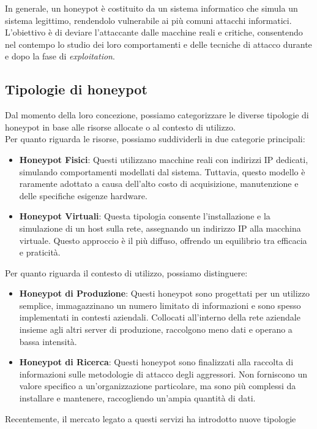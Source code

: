 \documentclass[12pt,a4paper,oneside,onecolumn,openright]{book}
\begin{document}
In generale, un honeypot è costituito da un sistema informatico che simula un 
sistema legittimo, rendendolo vulnerabile ai più comuni attacchi informatici. 
L'obiettivo è di deviare l'attaccante dalle macchine reali e critiche, consentendo 
nel contempo lo studio dei loro comportamenti e delle tecniche di attacco durante e 
dopo la fase di \textit{exploitation}.\\

\subsection{Tipologie di honeypot}
Dal momento della loro concezione, possiamo categorizzare le diverse tipologie di 
honeypot in base alle risorse allocate o al contesto di utilizzo.\\
Per quanto riguarda le risorse, possiamo suddividerli in due categorie principali:
\begin{itemize}
	\item \textbf{Honeypot Fisici}: Questi utilizzano macchine reali con indirizzi IP 
	dedicati, simulando comportamenti modellati dal sistema. Tuttavia, questo modello 
	è raramente adottato a causa dell'alto costo di acquisizione, manutenzione e 
	delle specifiche esigenze hardware.
	\item \textbf{Honeypot Virtuali}: Questa tipologia consente l'installazione e la 
	simulazione di un host sulla rete, assegnando un indirizzo IP alla macchina virtuale. 
	Questo approccio è il più diffuso, offrendo un equilibrio tra efficacia e praticità.
\end{itemize}
Per quanto riguarda il contesto di utilizzo, possiamo distinguere:
\begin{itemize}
	\item \textbf{Honeypot di Produzione}: Questi honeypot sono progettati per un 
	utilizzo semplice, immagazzinano un numero limitato di informazioni e sono 
	spesso implementati in contesti aziendali. Collocati all'interno della rete 
	aziendale insieme agli altri server di produzione, raccolgono meno dati e 
	operano a bassa intensità.
	\item \textbf{Honeypot di Ricerca}: Questi honeypot sono finalizzati alla raccolta 
	di informazioni sulle metodologie di attacco degli aggressori. Non forniscono un 
	valore specifico a un'organizzazione particolare, ma sono più complessi da installare 
	e mantenere, raccogliendo un'ampia quantità di dati.
\end{itemize}
Recentemente, il mercato legato a questi servizi ha introdotto nuove tipologie 
\end{document}
